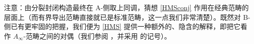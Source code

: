 
注意：由分裂封闭构造最终在 A-侧取上同调，猜想 \ref{HMSconj} 作用在经典范畴的层面上（而有界导出范畴直接就已是标准范畴，这一点我们非常清楚）。既然对 B-侧已有更牢固的把握，我们便为 \eqref{HMS} 提供一种额外的、隐含的解释，即把它看作 $A_\infty$-范畴之间的对偶（我们参阅 \cite[第 8.2.1 小节]{[ABC+09]}，并采用 \cite[第 2.2 节]{[Imp21]} 的记号）。

